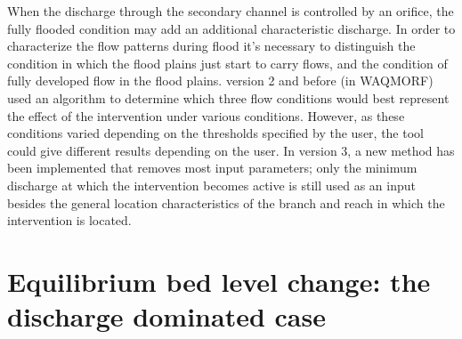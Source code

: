 When the discharge through the secondary channel is controlled by an orifice, the fully flooded condition may add an additional characteristic discharge.
In order to characterize the flow patterns during flood it's necessary to distinguish the condition in which the flood plains just start to carry flows, and the condition of fully developed flow in the flood plains.
\dfastmi version 2 and before (in WAQMORF) used an algorithm to determine which three flow conditions would best represent the effect of the intervention under various conditions.
However, as these conditions varied depending on the thresholds specified by the user, the tool could give different results depending on the user.
In \dfastmi version 3, a new method has been implemented that removes most input parameters; only the minimum discharge at which the intervention becomes active is still used as an input besides the general location characteristics of the branch and reach in which the intervention is located.


\section{Equilibrium bed level change: the discharge dominated case}

